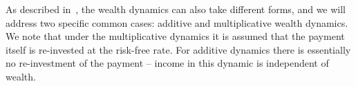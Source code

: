




As described in~, the wealth dynamics can also take different forms, and we will address two specific common cases: additive and multiplicative wealth dynamics. We note that under the multiplicative dynamics it is assumed that the payment itself is re-invested at the risk-free rate. For additive dynamics there is essentially no re-investment of the payment -- income in this dynamic is independent of wealth.

